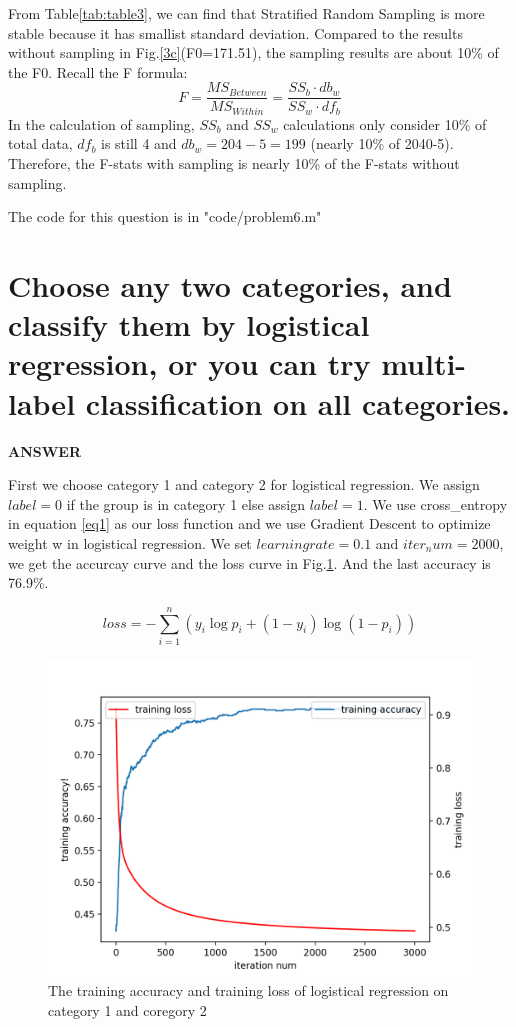 \documentclass[a4paper]{article}
\begin{document}
From Table\ref{tab:table3}, we can find that Stratified Random Sampling is more stable because it has smallist standard deviation. Compared to the results without sampling in Fig.\ref{3c}(F0=171.51), the sampling results are about 10\% of the F0. Recall the F formula:
\begin{equation}
F=\frac{MS_{Between}}{MS_{Within}}=\frac{SS_b\cdot db_w}{SS_w\cdot df_b}
\end{equation}
In the calculation of sampling, $SS_b$ and $SS_w$ calculations only consider 10\% of total data, $df_b$ is still 4 and $db_w=204-5=199$ (nearly 10\% of 2040-5). Therefore, the F-stats with sampling is nearly 10\% of the F-stats without sampling.

The code for this question is in "code/problem6.m"

\section{Choose any two categories, and classify them by logistical regression, or you can try multi-label classification on all categories.}

\textbf{ANSWER}

First we choose category 1 and category 2 for logistical regression. We assign $label=0$ if the group is in category 1 else assign $label=1$. We use cross\_entropy in equation \ref{eq1} as our loss function and we use Gradient Descent to optimize weight w in logistical regression. We set $learning rate=0.1$ and $iter_num=2000$, we get the accurcay curve and the loss curve in Fig.\ref{7}. And the last accuracy is 76.9\%.

\begin{equation}
\label{eq1}
loss = -\sum_{i=1}^{n}(y_i\log p_i +(1-y_i)\log(1-p_i))
\end{equation}

\begin{figure}[!h]
	\centering
	\includegraphics[width=\linewidth]{images/7.png}
	\caption{\label{7}The training accuracy and training loss of logistical regression on category 1 and coregory 2}
\end{figure}
\end{document}
